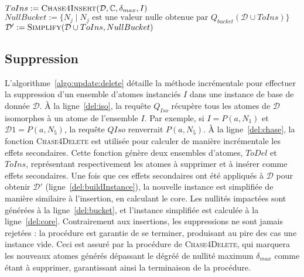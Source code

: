 \begin{algorithm}[ht]
    \caption{$\textsc{Insert}(\mathcal{D}, \mathbb{C}, \delta_{max}, I)$}
    \label{algo:update:insert}
    $ToIns := \textsc{Chase4Insert}(\mathcal{D}, \mathbb{C}, \delta_{max}, I)$ \label{algo:update:insert:chase} \;
    $NullBucket := \{N_j \mid N_j \text{ est une valeur nulle obtenue par } Q_{bucket}(\mathcal{D} \cup ToIns)\}$ \label{algo:update:insert:bucket} \;
    $\mathcal{D}' := \textsc{Simplify}(\mathcal{D} \cup ToIns, NullBucket)$ \label{algo:update:insert:core} \;
\end{algorithm}

\begin{example}

\end{example}

\subsection{Suppression}
\label{sec:update:delete}
L'algorithme~\ref{algo:update:delete} détaille la méthode incrémentale pour effectuer la suppression d'un ensemble d'atomes instanciés $I$ dans une instance de base de donnée $\mathcal{D}$.
À la ligne~\ref{del:iso}, la requête $Q_{Iso}$ récupère tous les atomes de $\mathcal{D}$ isomorphes à un atome de l'ensemble $I$.
Par exemple, si $I = {P(a, N_1)}$ et $\mathcal{D}1= {P(a, N_5)}$, la requête $Q{Iso}$ renverrait ${P(a, N_5)}$.
À la ligne~\ref{del:chase}, la fonction \textsc{Chase4Delete} est utilisée pour calculer de manière incrémentale les effets secondaires.
Cette fonction génère deux ensembles d'atomes, $ToDel$ et $ToIns$, représentant respectivement les atomes à supprimer et à insérer comme effets secondaires.
Une fois que ces effets secondaires ont été appliqués à $\mathcal{D}$ pour obtenir $\mathcal{D}'$ (ligne~\ref{del:buildInstance}), la nouvelle instance est simplifiée de manière similaire à l'insertion, en calculant le \gls{core}.
Les nullités impactées sont générées à la ligne~\ref{del:bucket}, et l'instance simplifiée est calculée à la ligne~\ref{del:core}.
Contrairement aux insertions, les suppressions ne sont jamais rejetées : la procédure est garantie de se terminer, produisant au pire des cas une instance vide.
Ceci est assuré par la procédure de \textsc{Chase4Delete}, qui marquera les nouveaux atomes générés dépassant le dégréé de nullité maximum $\delta_{max}$ comme étant à supprimer, garantissant ainsi la terminaison de la procédure.

